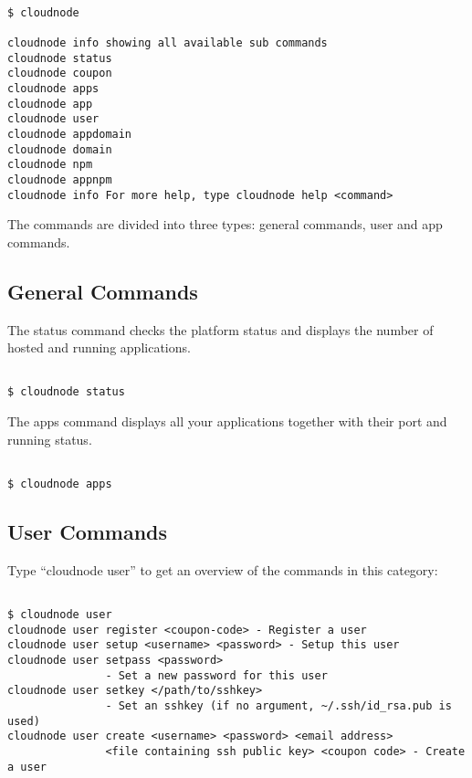 \begin{adjustwidth}{2.5em}{2.5em}
\begin{verbatim}

$ cloudnode

cloudnode info showing all available sub commands
cloudnode status
cloudnode coupon
cloudnode apps
cloudnode app
cloudnode user
cloudnode appdomain
cloudnode domain
cloudnode npm
cloudnode appnpm
cloudnode info For more help, type cloudnode help <command>

\end{verbatim}
\end{adjustwidth}

The commands are divided into three types: general commands, user and app commands.

\subsection{General Commands}
\label{generalcommands}

The status command checks the platform status and displays the number of hosted and running applications.

\begin{adjustwidth}{2.5em}{2.5em}
\begin{verbatim}

$ cloudnode status

\end{verbatim}
\end{adjustwidth}

The apps command displays all your applications together with their port and running status.

\begin{adjustwidth}{2.5em}{2.5em}
\begin{verbatim}

$ cloudnode apps

\end{verbatim}
\end{adjustwidth}

\subsection{User Commands}
\label{usercommands}

Type ``cloudnode user'' to get an overview of the commands in this category:

\begin{adjustwidth}{2.5em}{2.5em}
\begin{verbatim}

$ cloudnode user
cloudnode user register <coupon-code> - Register a user
cloudnode user setup <username> <password> - Setup this user
cloudnode user setpass <password> 
               - Set a new password for this user
cloudnode user setkey </path/to/sshkey> 
               - Set an sshkey (if no argument, ~/.ssh/id_rsa.pub is used)
cloudnode user create <username> <password> <email address> 
               <file containing ssh public key> <coupon code> - Create a user

\end{verbatim}
\end{adjustwidth}


